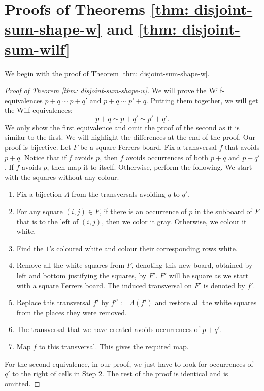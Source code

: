 \documentclass[12pt, english, a4paper]{article}
\theoremstyle{plain}
\theoremstyle{definition}
\theoremstyle{remark}
\begin{document}
\section{Proofs of Theorems \ref{thm: disjoint-sum-shape-w} and \ref{thm: disjoint-sum-wilf}}\label{sec: proofs-3-4}

We begin with the proof of Theorem \ref{thm: disjoint-sum-shape-w}.
\begin{proof}[Proof of Theorem \ref{thm: disjoint-sum-shape-w}]
We will prove the Wilf-equivalences $p+q\sim p+q'$ and 
$p+q \sim p'+q$. Putting them together, we will get the 
Wilf-equivalences:  $$p+q\sim p+q'\sim p'+q'.$$
We only show the first equivalence and omit the proof of the second as it is similar to the first. We will highlight the differences at the end of the proof.
Our proof is bijective.  Let $F$ be a square Ferrers board. 
Fix a transversal $f$ that avoids $p+q$. Notice that if $f$ avoids $p$, then $f$ avoids occurrences of both $p+q$ and $p+q'$.
If $f$ avoids $p$, then map it to itself.
    Otherwise, perform the following. We start with the squares without any colour.
    \begin{enumerate}
    \item Fix a bijection $\Lambda$ from the transversals avoiding $q$ to $q'$.
        \item For any square $(i,j)\in F$, if there is an occurrence of $p$ in the subboard of $F$ that is to the left of $(i,j)$, then we color it gray. Otherwise, we colour it white.
        \item Find the $1$'s coloured white and colour their corresponding rows white.
        \item Remove all the white squares from $F$, denoting this new board, obtained by left and bottom justifying the squares, by $F'$. $F'$ will be square as we start with a square Ferrers board. The induced transversal on $F'$ is denoted by $f'$. 
        \item Replace this transversal $f'$ by $f'':=\Lambda(f')$ and restore all the white squares from the places they were removed.
        \item The transversal that we have created avoids occurrences of $p+q'$.
        \item Map $f$ to this transversal. This gives the required map.
    \end{enumerate}
    For the second equivalence, in our proof, we just have to look for occurrences of $q'$ to the right of cells in Step $2$. The rest of the proof is identical and is omitted.
\end{proof}
\end{document}

